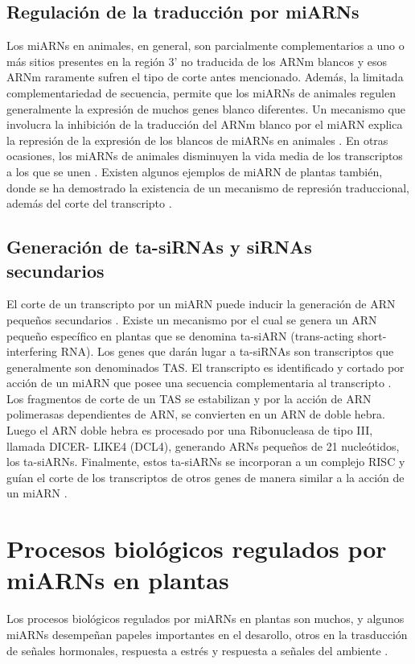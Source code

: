 \subsection{Regulación de la traducción por miARNs}

Los miARNs en animales, en general, son parcialmente complementarios a uno o más sitios presentes en la región 3' no traducida de los ARNm blancos \citep{pmid12869753,pmid8252621,Fabian} y esos ARNm raramente sufren el tipo de corte antes mencionado. 
Además, la limitada complementariedad de secuencia, permite que los miARNs de animales regulen generalmente la expresión de muchos genes blanco diferentes.
Un mecanismo que involucra la inhibición de la traducción del ARNm blanco por el miARN explica la represión de la expresión de los blancos de miARNs en animales \citep{Fabian}.
En otras ocasiones, los miARNs de animales disminuyen la vida media de los transcriptos a los que se unen \citep{pmid20703300}.
Existen algunos ejemplos de miARN de plantas también, donde se ha demostrado la existencia de un mecanismo de represión traduccional, además del corte del transcripto \citep{Schwab2005517,pmid19531599,pmid18392778,pmid18483398,pmid12893888,pmid14555699}.

\subsection{Generación de ta-siRNAs y siRNAs secundarios}
El corte de un transcripto por un miARN puede inducir la generación de ARN pequeños secundarios \citep{Allen2005207, pmid19066226,pmid19066226,pmid20643946,pmid20562854,pmid22308502}.
Existe un mecanismo por el cual se genera un ARN pequeño específico en plantas que se denomina ta-siARN (trans-acting short-interfering RNA).
Los genes que darán lugar a ta-siRNAs son transcriptos que generalmente son denominados TAS.
El transcripto es identificado y cortado por acción de un miARN que posee una secuencia complementaria al transcripto \citep{Allen2005207}.
Los fragmentos de corte de un TAS se estabilizan y por la acción de ARN polimerasas dependientes de ARN, se convierten en un ARN de doble hebra.
Luego el ARN doble hebra es procesado por una Ribonucleasa de tipo III, llamada DICER- LIKE4 (DCL4), generando ARNs pequeños de 21 nucleótidos, los ta-siARNs.
Finalmente, estos ta-siARNs se incorporan a un complejo RISC y guían el corte de los transcriptos de otros genes de manera similar a la acción de un miARN \citep{Allen2005207,pmid16040244,pmid16131612,Xie2005a}.


\section{Procesos biológicos regulados por miARNs en plantas}
Los procesos biológicos regulados por miARNs en plantas son muchos, y algunos miARNs desempeñan papeles importantes en el desarollo, otros en la trasducción de señales hormonales, respuesta a estrés y respuesta a señales del ambiente \citep{Voinnet2009669, pmid21466971, pmid19699140}.

